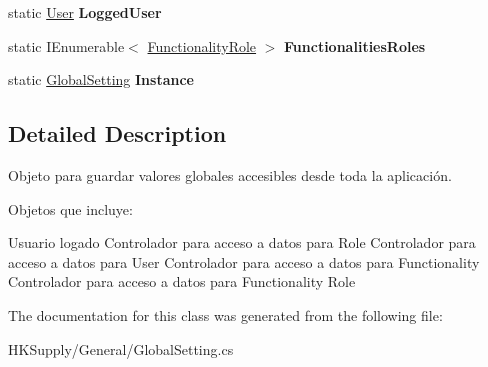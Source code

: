\begin{DoxyCompactItemize}
\item 
\mbox{\label{class_h_k_supply_1_1_general_1_1_global_setting_adeb470418d2461437e6dc55fd41f78f5}} 
static \hyperlink{class_h_k_supply_1_1_models_1_1_user}{User} {\bfseries Logged\+User}
\item 
\mbox{\label{class_h_k_supply_1_1_general_1_1_global_setting_adf54b9c3d32b3dac949776dee6f17eb2}} 
static I\+Enumerable$<$ \hyperlink{class_h_k_supply_1_1_models_1_1_functionality_role}{Functionality\+Role} $>$ {\bfseries Functionalities\+Roles}
\item 
\mbox{\label{class_h_k_supply_1_1_general_1_1_global_setting_afa2d235e79652e93864a33932863c1e2}} 
static \hyperlink{class_h_k_supply_1_1_general_1_1_global_setting}{Global\+Setting} {\bfseries Instance}
\end{DoxyCompactItemize}


\subsection{Detailed Description}
Objeto para guardar valores globales accesibles desde toda la aplicación. 

Objetos que incluye\+:
\begin{DoxyItemize}
\item Usuario logado Controlador para acceso a datos para Role Controlador para acceso a datos para User Controlador para acceso a datos para Functionality Controlador para acceso a datos para Functionality Role 
\end{DoxyItemize}

The documentation for this class was generated from the following file\+:\begin{DoxyCompactItemize}
\item 
H\+K\+Supply/\+General/Global\+Setting.\+cs\end{DoxyCompactItemize}
